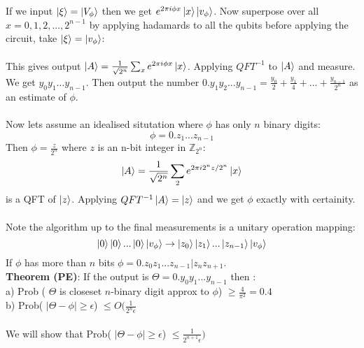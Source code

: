 \documentclass{article}
\begin{document}
{               If we input $\ket{\xi} = \ket{ V_{\phi}}$ then we get $e^{2\pi i \phi x} \ket{x} \ket{v_{\phi}}$. Now superpose over all $x = 0,1,2,..., 2^{n-1}$ by applying hadamards to all the qubits before applying the circuit, take $\ket{\xi} = \ket{v_{\phi}}$:
\\\\
This gives output $\ket{A} = \frac{1}{\sqrt{2^n}} \sum_x e^{2\pi i \phi x} \ket{x}$. Applying $QFT^{-1}$ to $\ket{A}$ and measure. We get $y_0 y_1 ... y_{n-1}$. Then output the number $0.y_1y_2...y_{n-1} = \frac{y_0}{2} + \frac{y_1}{4} + ... + \frac{y_{n-1}}{2^{n}}$ as an estimate of $\phi$.\\\\ Now lets assume an idealised situtation where $\phi$ has only $n$ binary digits:
$$
\phi = 0.z_1...z_{n-1}
$$
Then $\phi = \frac{z}{2^n}$ where $z$ is an n-bit integer in $\mathbb{Z}_{2^n}$:
$$
\ket{A} = \frac{1}{\sqrt{2^n}} \sum_2 e^{2\pi i 2^n z/2^n} \ket{x} 
$$
is a QFT of $\ket{z}$. Applying $QFT^{-1} \ket{A} = \ket{z}$ and we get $\phi$ exactly with certainity.\\\\
Note the algorithm up to the final measurements is a unitary operation mapping:
$$
\ket{0} \ket{0} ... \ket{0} \ket{ v_{\phi}} \rightarrow \ket{z_0} \ket{z_1} ... \ket{z_{n-1}} \ket{v_{\phi}}
$$
If $\phi$ has more than $n$ bits $\phi = 0.z_0 z_1... z_{n-1}| z_{n} z_{n+1}$.\\
\textbf{Theorem (PE)}: If the output is $\Theta = 0. y_0y_1...y_{n-1}$ then :\\
a) Prob ( $\Theta$ is closeset $n$-binary digit approx to $\phi$) $\geq \frac{4}{\pi^2} = 0.4$\\
b) Prob( $|\Theta - \phi| \geq \epsilon$) $\leq O(\frac{1}{2^n \epsilon}$\\\\
We will show that  Prob( $|\Theta - \phi| \geq \epsilon$) $\leq \frac{1}{2^{n+1} \epsilon})$
}
\end{document}
